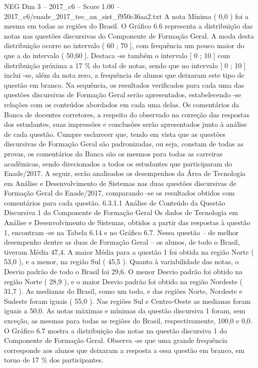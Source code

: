\begin{textsample}{NEG Dim 3 – 2017\_c6 – Score 1.00 – 2017\_c6/enade\_2017\_tec\_an\_sist\_f950c36aa2.txt}
A nota Mínima ( 0,0 ) foi a mesma em todas as regiões do Brasil.
O Gráfico 6.6 representa a distribuição das notas nas questões discursivas do Componente de Formação Geral.
A moda desta distribuição ocorre no intervalo ( 60 ; 70 ], com frequência um pouco maior do que a do intervalo ( 50,60 ].
Destaca -se também o intervalo [ 0 ; 10 ] com distribuição próxima a 17 \% do total de notas, sendo que no intervalo [ 0 ; 10 ] inclui -se, além da nota zero, a frequência de alunos que deixaram este tipo de questão em branco.
Na sequência, os resultados verificados para cada uma das questões discursivas de Formação Geral serão apresentados, estabelecendo -se relações com os conteúdos abordados em cada uma delas.
Os comentários da Banca de docentes corretores, a respeito do observado na correção das respostas dos estudantes, suas impressões e conclusões serão apresentados junto à análise de cada questão.
Cumpre esclarecer que, tendo em vista que as questões discursivas de Formação Geral são padronizadas, ou seja, constam de todas as provas, os comentários da Banca são os mesmos para todas as carreiras acadêmicas, sendo direcionados a todos os estudantes que participaram do Enade/2017.
A seguir, serão analisados os desempenhos da Área de Tecnologia em Análise e Desenvolvimento de Sistemas nas duas questões discursivas de Formação Geral do Enade/2017, comparando -se os resultados obtidos com comentários para cada questão. 6.3.1.1 Análise de Conteúdo da Questão Discursiva 1 do Componente de Formação Geral Os dados de Tecnologia em Análise e Desenvolvimento de Sistemas, obtidos a partir das respostas à questão 1, encontram -se na Tabela 6.14 e no Gráfico 6.7.
Nessa questão – de melhor desempenho dentre as duas de Formação Geral – os alunos, de todo o Brasil, tiveram Média 47,4.
A maior Média para a questão 1 foi obtida na região Norte ( 53,0 ), e a menor, na região Sul ( 45,5 ).
Quanto à variabilidade das notas, o Desvio padrão de todo o Brasil foi 29,6.
O menor Desvio padrão foi obtido na região Norte ( 28,9 ), e o maior Desvio padrão foi obtido na região Nordeste ( 31,7 ).
As medianas do Brasil, como um todo, e das regiões Norte, Nordeste e Sudeste foram iguais ( 55,0 ).
Nas regiões Sul e Centro-Oeste as medianas foram iguais a 50,0.
As notas máximas e mínimas da questão discursiva 1 foram, sem exceção, as mesmas para todas as regiões do Brasil, respectivamente, 100,0 e 0,0.
O Gráfico 6.7 mostra a distribuição das notas na questão discursiva 1 do Componente de Formação Geral.
Observa -se que uma grande frequência corresponde aos alunos que deixaram a resposta a essa questão em branco, em torno de 17 \% dos participantes.

\end{textsample}
